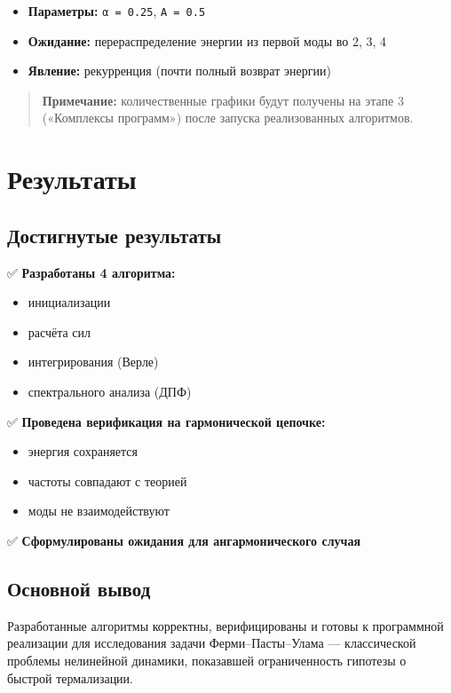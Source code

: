 \documentclass[
  12pt,
  a4paper,
  DIV=11,
  numbers=noendperiod]{scrreprt}
\providecommand{\tightlist}{%
  \setlength{\itemsep}{0pt}\setlength{\parskip}{0pt}}\usepackage{longtable,booktabs,array}
\begin{document}
\begin{itemize}
\tightlist
\item
  \textbf{Параметры:} \texttt{α\ =\ 0.25}, \texttt{A\ =\ 0.5}
\item
  \textbf{Ожидание:} перераспределение энергии из первой моды во 2, 3, 4
\item
  \textbf{Явление:} рекурренция (почти полный возврат энергии)
\end{itemize}

\begin{quote}
\textbf{Примечание:} количественные графики будут получены на этапе 3
(«Комплексы программ») после запуска реализованных алгоритмов.
\end{quote}

\chapter{Результаты}\label{ux440ux435ux437ux443ux43bux44cux442ux430ux442ux44b}

\section{Достигнутые
результаты}\label{ux434ux43eux441ux442ux438ux433ux43dux443ux442ux44bux435-ux440ux435ux437ux443ux43bux44cux442ux430ux442ux44b}

✅ \textbf{Разработаны 4 алгоритма:}

\begin{itemize}
\tightlist
\item
  инициализации
\item
  расчёта сил
\item
  интегрирования (Верле)
\item
  спектрального анализа (ДПФ)
\end{itemize}

✅ \textbf{Проведена верификация на гармонической цепочке:}

\begin{itemize}
\tightlist
\item
  энергия сохраняется
\item
  частоты совпадают с теорией
\item
  моды не взаимодействуют
\end{itemize}

✅ \textbf{Сформулированы ожидания для ангармонического случая}

\section{Основной
вывод}\label{ux43eux441ux43dux43eux432ux43dux43eux439-ux432ux44bux432ux43eux434}

Разработанные алгоритмы корректны, верифицированы и готовы к программной
реализации для исследования задачи Ферми--Пасты--Улама --- классической
проблемы нелинейной динамики, показавшей ограниченность гипотезы о
быстрой термализации.


\printbibliography
\end{document}
